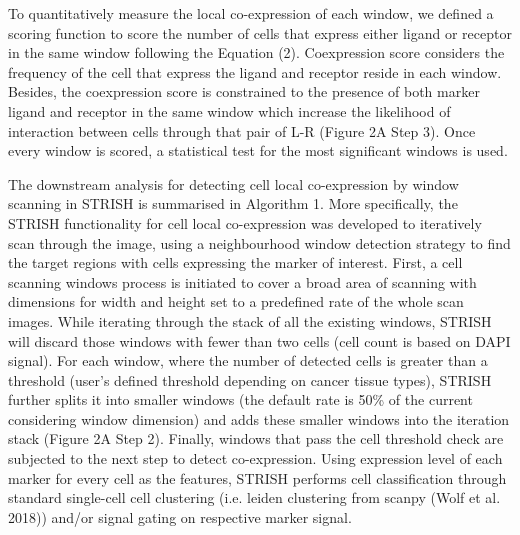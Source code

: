 To quantitatively measure the local co-expression of each window, we defined a scoring function to score the number of cells that express either ligand or receptor in the same window following the Equation (2). Coexpression score considers the frequency of the cell that express the ligand and receptor reside in each window. Besides, the coexpression score is constrained to the presence of both marker ligand and receptor in the same window which increase the likelihood of interaction between cells through that pair of L-R (Figure 2A Step 3). Once every window is scored, a statistical test for the most significant windows is used.     

The downstream analysis for detecting cell local co-expression by window scanning in STRISH is summarised in Algorithm 1. More specifically, the STRISH functionality for cell local co-expression was developed to iteratively scan through the image, using a neighbourhood window detection strategy to find the target regions with cells expressing the marker of interest. First, a cell scanning windows process is initiated to cover a broad area of scanning with dimensions for width and height set to a predefined rate of the whole scan images. While iterating through the stack of all the existing windows, STRISH will discard those windows with fewer than two cells (cell count is based on DAPI signal). For each window, where the number of detected cells is greater than a threshold (user’s defined threshold depending on cancer tissue types), STRISH further splits it into smaller windows (the default rate is 50\% of the current considering window dimension) and adds these smaller windows into the iteration stack (Figure 2A Step 2). Finally, windows that pass the cell threshold check are subjected to the next step to detect co-expression. Using expression level of each marker for every cell as the features, STRISH performs cell classification through standard single-cell cell clustering (i.e. leiden clustering from scanpy (Wolf et al. 2018)) and/or signal gating on respective marker signal.
